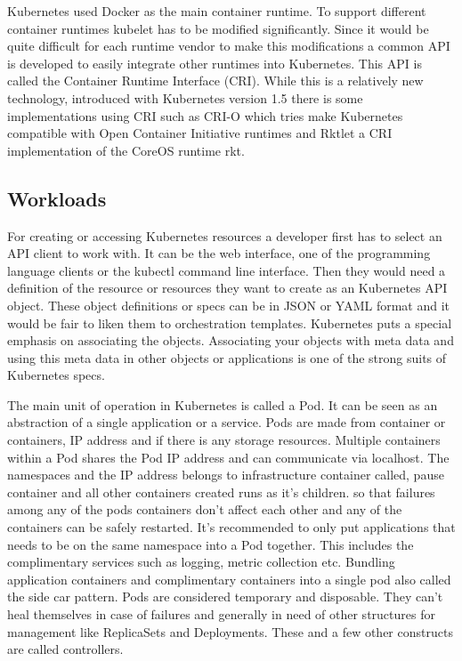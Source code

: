 \documentclass[12pt,oneandhalf,chaparabic,ceng,ms,eng,oneside,pntc]{gsufbe}
\begin{document}
Kubernetes used Docker as the main container runtime. To support different container runtimes kubelet
has to be modified significantly. Since it would be quite difficult for each runtime vendor to make
this modifications a common API is developed to easily integrate other runtimes into Kubernetes. This
API is called the Container Runtime Interface (CRI). While this is a relatively new technology,
introduced with Kubernetes version 1.5 there is some implementations using CRI such as CRI-O which
tries make Kubernetes compatible with Open Container Initiative runtimes and Rktlet a CRI
implementation of the CoreOS runtime rkt.

\subsection{Workloads}
For creating or accessing Kubernetes resources a developer first has to select an API client to work
with. It can be the web interface, one of the programming language clients or the kubectl command line
interface. Then they would need a definition of the resource or resources they want to create as an
Kubernetes API object. These object definitions or specs can be in JSON or YAML format and it would be
fair to liken them to orchestration templates. Kubernetes puts a special emphasis on associating the
objects. Associating your objects with meta data and using this meta data in other objects or
applications is one of the strong suits of Kubernetes specs.

The main unit of operation in Kubernetes is called a Pod. It can be seen as an abstraction of a single
application or a service. Pods are made from container or containers, IP address and if there is any
storage resources. Multiple containers within a Pod shares the Pod IP address and can communicate via
localhost. The namespaces and the IP address belongs to infrastructure container called, pause 
container and all other containers created runs as it’s children. so that failures among any of the 
pods containers don't affect each other and any of the containers can be safely restarted. It's 
recommended to only put applications that needs to be on the same namespace into a Pod together. This
includes the complimentary services such as logging, metric collection etc. Bundling application
containers and complimentary containers into a single pod also called the side car pattern. Pods are
considered temporary and disposable. They can’t heal themselves in case of failures and generally in
need of other structures for management like ReplicaSets and Deployments. These and a few other
constructs are called controllers.
\end{document}
